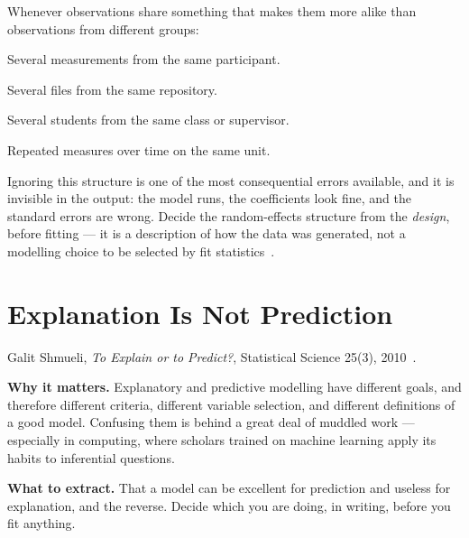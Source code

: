 \begin{conceptbox}
Whenever observations share something that makes them more alike than
observations from different groups:

\begin{tight}
  \item Several measurements from the same participant.
  \item Several files from the same repository.
  \item Several students from the same class or supervisor.
  \item Repeated measures over time on the same unit.
\end{tight}

\medskip
Ignoring this structure is one of the most consequential errors available, and
it is invisible in the output: the model runs, the coefficients look fine, and
the standard errors are wrong. Decide the random-effects structure from the
\emph{design}, before fitting --- it is a description of how the data was
generated, not a modelling choice to be selected by fit
statistics~\cite{bates2015fitting}.
\end{conceptbox}

\section{Explanation Is Not Prediction}

\begin{paperbox}
Galit Shmueli, \emph{To Explain or to Predict?}, Statistical Science 25(3),
2010~\cite{shmueli2010explain}.\oa{}

\medskip
\textbf{Why it matters.} Explanatory and predictive modelling have different
goals, and therefore different criteria, different variable selection, and
different definitions of a good model. Confusing them is behind a great deal of
muddled work --- especially in computing, where scholars trained on machine
learning apply its habits to inferential questions.

\medskip
\textbf{What to extract.} That a model can be excellent for prediction and
useless for explanation, and the reverse. Decide which you are doing, in
writing, before you fit anything.
\end{paperbox}

